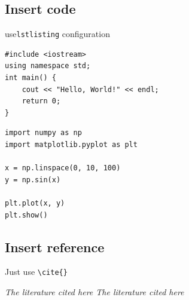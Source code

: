 \documentclass[12pt,hyperref,a4paper,UTF8]{ctexart}
\begin{document}
\subsection{Insert code}
use\verb|lstlisting| configuration
\begin{lstlisting}[style=CPP, title="c++ code"]
#include <iostream>
using namespace std;
int main() {
    cout << "Hello, World!" << endl;
    return 0;
}

\end{lstlisting}

\begin{lstlisting}[style=Python, title="Python code"]
import numpy as np
import matplotlib.pyplot as plt

x = np.linspace(0, 10, 100)
y = np.sin(x)

plt.plot(x, y)
plt.show()
\end{lstlisting}

\subsection{Insert reference}

Just use \verb|\cite{}|

   \textit{ The literature cited here  \cite{liu2023backdoor}  The literature cited here \cite{du2024sequential} }


\end{document}
